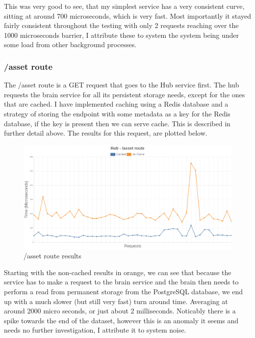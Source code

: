 \documentclass[titlepage]{article}
\begin{document}
This was very good to see, that my simplest service has a very consistent curve, sitting at around 700 microseconds, which is very fast. Most importantly it stayed fairly consistent throughout the testing with only 2 requests reaching over the 1000 microseconds barrier, I attribute these to system the system being under some load from other background processes.

\pagebreak
\subsubsection{/asset route}
The /asset route is a GET request that goes to the Hub service first. The hub requests the brain service for all its persistent storage needs, except for the ones that are cached. I have implemented caching using a Redis database and a strategy of storing the endpoint with some metadata as a key for the Redis database, if the key is present then we can serve cache. This is described in further detail above. The results for this request, are plotted below.

\begin{figure}[h!]
  \caption{/asset route results}
\hspace*{-3cm}
\includegraphics[width=1.5\textwidth]{../results/asset.png}
\end{figure}

Starting with the non-cached results in orange, we can see that because the service has to make a request to the brain service and the brain then needs to perform a read from permanent storage from the PostgreSQL database, we end up with a much slower (but still very fast) turn around time. Averaging at around 2000 micro seconds, or just about 2 milliseconds. Noticably there is a spike towards the end of the dataset, however this is an anomaly it seems and needs no further investigation, I attribute it to system noise. \\
\end{document}
